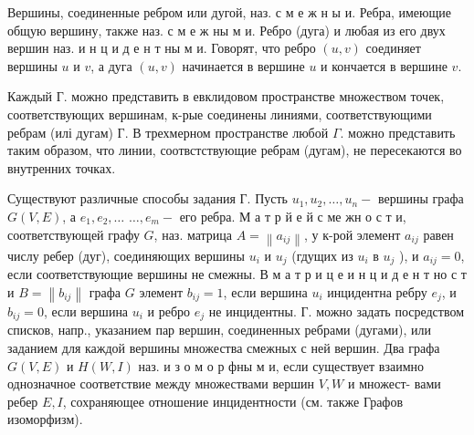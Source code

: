 \documentclass[10pt]{article}
\begin{document}
Вершины, соединенные ребром или дугой, наз. с м е ж н ы и. Ребра, имеющие общую вершину, также наз. с м е ж ны м и. Ребро (дуга) и любая из его двух вершин наз. и н ц и д е н т ны м и. Говорят, что ребро $(u, v)$ соединяет вершины $u$ и $v$, а дуга $(u, v)$ начинается в вершине $u$ и кончается в вершине $v$.



Каждый Г. можно представить в евклидовом пространстве множеством точек, соответствующих вершинам, к-рые соединены линиями, соответствующими ребрам (илі дугам) Г. В трехмерном пространстве любой $\Gamma$. можно представить таким образом, что линии, соотвстствующие ребрам (дугам), не пересекаются во внутренних точках.



Существуют различные способы задания Г. Пусть $u_{1}, u_{2}, \ldots, u_{n}-$ вершины графа $G(V, E)$, а $e_{1}, e_{2}, \ldots$ $\ldots, e_{m}-$ его ребра. М а т р й е й с ме жн о с т и, соответствующей графу $G$, наз. матрица $A=\left\|a_{i j}\right\|$, у к-рой элемент $a_{i j}$ равен числу ребер (дуг), соединяющих вершины $u_{i}$ и $u_{j}$ (гдущих из $u_{i}$ в $u_{j}$ ), и $a_{i j}=0$, если соответствующие вершины не смежны. В м а т р и ц е и н ц и д е н т но с т и $B=\left\|b_{i j}\right\|$ графа $G$ элемент $b_{i j}=1$, если вершина $u_{i}$ инцидентна ребру $e_{j}$, и $b_{i j}=0$, если вершина $u_{i}$ и ребро $e_{j}$ не инцидентны. Г. можно задать посредством списков, напр., указанием пар вершин, соединенных ребрами (дугами), или заданием для каждой вершины множества смежных с ней вершин. Два графа $G(V, E)$ и $H(W, I)$ наз. и з о м о р фны м и, если существует взаимно однозначное соответствие между множествами вершин $V, W$ и множест- вами ребер $E, I$, сохраняющее отношение инцидентности (см. также Графов изоморфизм).
\end{document}
